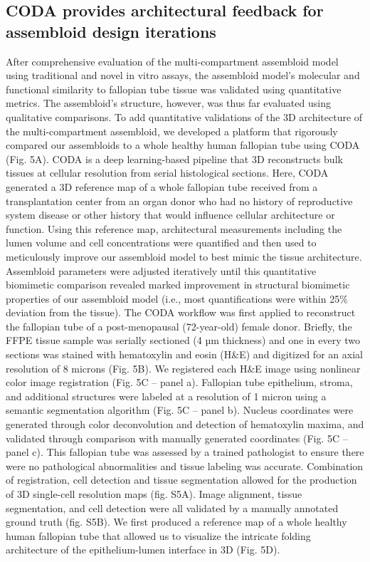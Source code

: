 \begin{refsection}
    
    \subsection{CODA provides architectural feedback for assembloid design iterations}
    After comprehensive evaluation of the multi-compartment assembloid model using traditional and novel in vitro assays, the assembloid model’s molecular and functional similarity to fallopian tube tissue was validated using quantitative metrics. The assembloid’s structure, however, was thus far evaluated using qualitative comparisons. To add quantitative validations of the 3D architecture of the multi-compartment assembloid, we developed a platform that rigorously compared our assembloids to a whole healthy human fallopian tube using CODA (Fig. 5A). CODA is a deep learning-based pipeline that 3D reconstructs bulk tissues at cellular resolution from serial histological sections\cite{kiemen2022a,Braxton20243D}. Here, CODA generated a 3D reference map of a whole fallopian tube received from a transplantation center from an organ donor who had no history of reproductive system disease or other history that would influence cellular architecture or function. Using this reference map, architectural measurements including the lumen volume and cell concentrations were quantified and then used to meticulously improve our assembloid model to best mimic the tissue architecture. Assembloid parameters were adjusted iteratively until this quantitative biomimetic comparison revealed marked improvement in structural biomimetic properties of our assembloid model (i.e., most quantifications were within 25\% deviation from the tissue).
    The CODA workflow was first applied to reconstruct the fallopian tube of a post-menopausal (72-year-old) female donor. Briefly, the FFPE tissue sample was serially sectioned (4 µm thickness) and one in every two sections was stained with hematoxylin and eosin (H\&E) and digitized for an axial resolution of 8 microns (Fig. 5B). We registered each H\&E image using nonlinear color image registration\cite{kiemen2022a} (Fig. 5C – panel a). Fallopian tube epithelium, stroma, and additional structures were labeled at a resolution of 1 micron using a semantic segmentation algorithm (Fig. 5C – panel b). Nucleus coordinates were generated through color deconvolution and detection of hematoxylin maxima, and validated through comparison with manually generated coordinates\cite{kiemen2022a} (Fig. 5C – panel c). This fallopian tube was assessed by a trained pathologist to ensure there were no pathological abnormalities and tissue labeling was accurate. Combination of registration, cell detection and tissue segmentation allowed for the production of 3D single-cell resolution maps (fig. S5A). Image alignment, tissue segmentation, and cell detection were all validated by a manually annotated ground truth (fig. S5B). We first produced a reference map of a whole healthy human fallopian tube that allowed us to visualize the intricate folding architecture of the epithelium-lumen interface in 3D (Fig. 5D). 

\end{refsection}
